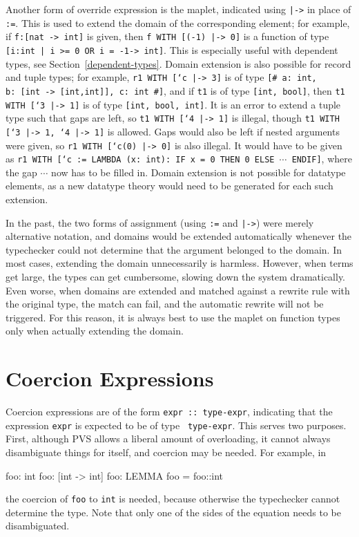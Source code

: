 Another form of override expression is the maplet, indicated using
\texttt{|->} in place of \texttt{:=}.  This is used to extend the domain
of the corresponding element; for example, if \texttt{f:[nat -> int]} is
given, then \texttt{f WITH [(-1) |-> 0]} is a function of type
\texttt{[\setb{}i:int | i >= 0 OR i = -1\sete -> int]}.  This is especially useful
with dependent types, see Section~\ref{dependent-types}.  Domain extension
is also possible for record and tuple types; for example, \texttt{r1 WITH
[`c |-> 3]} is of type \texttt{[\# a:\ int, b:\ [int -> [int,int]], c:\ int
\#]}, and if \texttt{t1} is of type \texttt{[int, bool]}, then \texttt{t1
WITH [`3 |-> 1]} is of type \texttt{[int, bool, int]}.  It is an error to
extend a tuple type such that gaps are left, so \texttt{t1 WITH [`4 |->
1]} is illegal, though \texttt{t1 WITH [`3 |-> 1, `4 |-> 1]} is allowed.
Gaps would also be left if nested arguments were given, so \texttt{r1 WITH
[`c(0) |-> 0]} is also illegal.  It would have to be given as \texttt{r1
WITH [`c := LAMBDA (x:\ int):\ IF x = 0 THEN 0 ELSE $\cdots$ ENDIF]}, where
the gap $\cdots$ now has to be filled in.  Domain extension is not
possible for datatype elements, as a new datatype theory would need to be
generated for each such extension.

In the past, the two forms of assignment (using \texttt{:=} and
\texttt{|->}) were merely alternative notation, and domains would be
extended automatically whenever the typechecker could not determine that
the argument belonged to the domain.  In most cases, extending the domain
unnecessarily is harmless.  However, when terms get large, the types can
get cumbersome, slowing down the system dramatically.  Even worse, when
domains are extended and matched against a rewrite rule with the original
type, the match can fail, and the automatic rewrite will not be triggered.
For this reason, it is always best to use the maplet on function types
only when actually extending the domain.

\section{Coercion Expressions}\label{coercions}

Coercion expressions are of the form \texttt{expr ::\ type-expr}, indicating
that the expression \texttt{expr} is expected to be of type \texttt{
type-expr}.  This serves two purposes.  First, although PVS allows a
liberal amount of overloading, it cannot always disambiguate things for
itself, and coercion may be needed.  For example, in
\begin{pvsex}
  foo: int
  foo: [int -> int]
  foo: LEMMA foo = foo::int
\end{pvsex}
%
the coercion of \texttt{foo} to \texttt{int} is needed, because otherwise the
typechecker cannot determine the type.  Note that only one of the sides
of the equation needs to be disambiguated.

